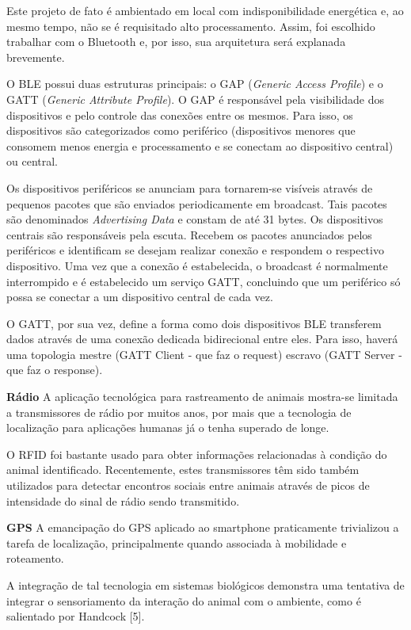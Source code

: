 Este projeto de fato é ambientado em local com indisponibilidade energética e, ao mesmo tempo, não se é requisitado alto processamento. Assim, foi escolhido trabalhar com o Bluetooth e, por isso, sua arquitetura será explanada brevemente.

O BLE possui duas estruturas principais: o GAP (\textit{Generic Access Profile}) e o GATT (\textit{Generic Attribute Profile}). O GAP é responsável pela visibilidade dos dispositivos e pelo controle das conexões entre os mesmos. Para isso, os dispositivos são categorizados como periférico (dispositivos menores que consomem menos energia e processamento e se conectam ao dispositivo central) ou central.

Os dispositivos periféricos se anunciam para tornarem-se visíveis através de pequenos pacotes que são enviados periodicamente em broadcast. Tais pacotes são denominados \textit{Advertising Data} e constam de até 31 bytes. Os dispositivos centrais são responsáveis pela escuta. Recebem os pacotes anunciados pelos periféricos e identificam se desejam realizar conexão e respondem o respectivo dispositivo. Uma vez que a conexão é estabelecida, o broadcast é normalmente interrompido e é estabelecido um serviço GATT, concluindo que um periférico só possa se conectar a um dispositivo central de cada vez.

O GATT, por sua vez, define a forma como dois dispositivos BLE transferem dados através de uma conexão dedicada bidirecional entre eles. Para isso, haverá uma topologia mestre (GATT Client - que faz o request) escravo (GATT Server - que faz o response).

\textbf{Rádio}
A aplicação tecnológica para rastreamento de animais mostra-se limitada a transmissores de rádio por muitos anos, por mais que a tecnologia de localização para aplicações humanas já o tenha superado de longe.

O RFID foi bastante usado para obter informações relacionadas à condição do animal identificado. Recentemente, estes transmissores têm sido também utilizados para detectar encontros sociais entre animais através de picos de intensidade do sinal de rádio sendo transmitido.

\textbf{GPS}
A emancipação do GPS aplicado ao smartphone praticamente trivializou a tarefa de localização, principalmente quando associada à mobilidade e roteamento.

A integração de tal tecnologia em sistemas biológicos demonstra uma tentativa de integrar o sensoriamento da interação do animal com o ambiente, como é salientado por Handcock [5].

